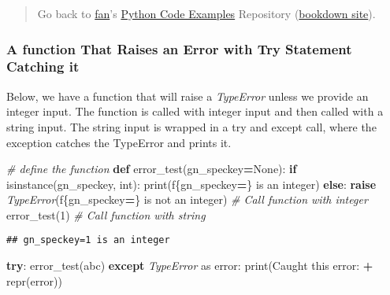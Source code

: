 \documentclass[
]{book}
\newenvironment{Shaded}{\begin{snugshade}}{\end{snugshade}}
\newcommand{\BuiltInTok}[1]{#1}
\newcommand{\CommentTok}[1]{\textcolor[rgb]{0.56,0.35,0.01}{\textit{#1}}}
\newcommand{\ControlFlowTok}[1]{\textcolor[rgb]{0.13,0.29,0.53}{\textbf{#1}}}
\newcommand{\DecValTok}[1]{\textcolor[rgb]{0.00,0.00,0.81}{#1}}
\newcommand{\ImportTok}[1]{#1}
\newcommand{\KeywordTok}[1]{\textcolor[rgb]{0.13,0.29,0.53}{\textbf{#1}}}
\newcommand{\NormalTok}[1]{#1}
\newcommand{\OperatorTok}[1]{\textcolor[rgb]{0.81,0.36,0.00}{\textbf{#1}}}
\newcommand{\PreprocessorTok}[1]{\textcolor[rgb]{0.56,0.35,0.01}{\textit{#1}}}
\newcommand{\SpecialCharTok}[1]{\textcolor[rgb]{0.00,0.00,0.00}{#1}}
\newcommand{\SpecialStringTok}[1]{\textcolor[rgb]{0.31,0.60,0.02}{#1}}
\newcommand{\StringTok}[1]{\textcolor[rgb]{0.31,0.60,0.02}{#1}}
\newcommand{\VariableTok}[1]{\textcolor[rgb]{0.00,0.00,0.00}{#1}}
\begin{document}
\begin{quote}
Go back to \href{http://fanwangecon.github.io/}{fan}'s \href{https://fanwangecon.github.io/pyfan/}{Python Code Examples} Repository (\href{https://fanwangecon.github.io/pyfan/bookdown}{bookdown site}).
\end{quote}

\hypertarget{a-function-that-raises-an-error-with-try-statement-catching-it}{%
\subsubsection{A function That Raises an Error with Try Statement Catching it}\label{a-function-that-raises-an-error-with-try-statement-catching-it}}

Below, we have a function that will raise a \emph{TypeError} unless we provide an integer input. The function is called with integer input and then called with a string input. The string input is wrapped in a try and except call, where the exception catches the TypeError and prints it.

\begin{Shaded}
\begin{Highlighting}[]
\CommentTok{\# define the function}
\KeywordTok{def}\NormalTok{ error\_test(gn\_speckey}\OperatorTok{=}\VariableTok{None}\NormalTok{):}
    \ControlFlowTok{if} \BuiltInTok{isinstance}\NormalTok{(gn\_speckey, }\BuiltInTok{int}\NormalTok{):}
        \BuiltInTok{print}\NormalTok{(}\SpecialStringTok{f\textquotesingle{}}\SpecialCharTok{\{}\NormalTok{gn\_speckey}\OperatorTok{=}\SpecialCharTok{\}}\SpecialStringTok{ is an integer\textquotesingle{}}\NormalTok{)}
    \ControlFlowTok{else}\NormalTok{:}
        \ControlFlowTok{raise} \PreprocessorTok{TypeError}\NormalTok{(}\SpecialStringTok{f\textquotesingle{}}\SpecialCharTok{\{}\NormalTok{gn\_speckey}\OperatorTok{=}\SpecialCharTok{\}}\SpecialStringTok{ is not an integer\textquotesingle{}}\NormalTok{)}
\CommentTok{\# Call function with integer}
\NormalTok{error\_test(}\DecValTok{1}\NormalTok{)}
\CommentTok{\# Call function with string}
\end{Highlighting}
\end{Shaded}

\begin{verbatim}
## gn_speckey=1 is an integer
\end{verbatim}

\begin{Shaded}
\begin{Highlighting}[]
\ControlFlowTok{try}\NormalTok{:}
\NormalTok{    error\_test(}\StringTok{\textquotesingle{}abc\textquotesingle{}}\NormalTok{)}
\ControlFlowTok{except} \PreprocessorTok{TypeError} \ImportTok{as}\NormalTok{ error:}
    \BuiltInTok{print}\NormalTok{(}\StringTok{\textquotesingle{}Caught this error: \textquotesingle{}} \OperatorTok{+} \BuiltInTok{repr}\NormalTok{(error))}
\end{Highlighting}
\end{Shaded}
\end{document}
